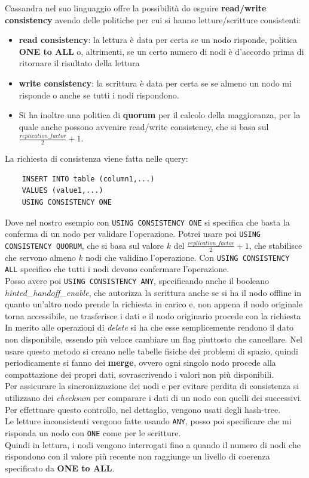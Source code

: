 Cassandra nel suo linguaggio offre la possibilità do esguire \textbf{read/write consistency} avendo delle politiche per cui si hanno letture/scritture consistenti:
\begin{itemize}
  \item \textbf{read consistency}: la lettura è data per certa se un nodo risponde, politica \textbf{ONE to ALL} o, altrimenti, se un certo numero di nodi è d'accordo prima di ritornare il risultato della lettura
  \item \textbf{write consistency}: la scrittura è data per certa se se almeno un nodo mi risponde o anche se tutti i nodi rispondono. 
  \item Si ha inoltre una politica di \textbf{quorum} per il calcolo della maggioranza, per la quale anche possono avvenire read/write consistency, che si basa sul \textbf{$\frac{replication \_ factor}{2} + 1$}.
\end{itemize}
La richiesta di consistenza viene fatta nelle query: 
\begin{lstlisting}
    INSERT INTO table (column1,...) 
    VALUES (value1,...) 
    USING CONSISTENCY ONE
\end{lstlisting} 
Dove nel nostro esempio con \texttt{USING CONSISTENCY ONE} si specifica che basta la conferma di un nodo per validare l'operazione. Potrei usare poi \texttt{USING CONSISTENCY QUORUM}, che si basa sul valore $k$ del \textit{$\frac{replication \_ factor}{2} + 1$}, che stabilisce che servono almeno $k$ nodi che validino l'operazione. Con \texttt{USING CONSISTENCY ALL} specifico che tutti i nodi devono confermare l'operazione.\\

Posso avere poi \texttt{USING CONSISTENCY ANY}, specificando anche il booleano \textit{hinted\_handoff\_enable}, che autorizza la scrittura anche se si ha il nodo offline in quanto un'altro nodo prende la richiesta in carico e, non appena il nodo originale torna accessibile, ne trasferisce i dati e il nodo originario procede con la richiesta\\

In merito alle operazioni di \textit{delete} si ha che esse semplicemente rendono il dato non disponibile, essendo più veloce cambiare un flag piuttosto che cancellare. Nel usare questo metodo si creano nelle tabelle fisiche dei problemi di spazio, quindi periodicamente si fanno dei \textbf{merge}, ovvero ogni singolo nodo procede alla compattazione dei propri dati, sovrascrivendo i valori non più disponibili.\\

Per assicurare la sincronizzazione dei nodi e per evitare perdita di consistenza si utilizzano dei \textit{checksum} per comparare i dati di un nodo con quelli dei successivi. Per effettuare questo controllo, nel dettaglio, vengono usati degli hash-tree.\\

Le letture inconsistenti vengono fatte usando \texttt{ANY}, posso poi specificare che mi risponda un nodo con \texttt{ONE} come per le scritture.\\ 
Quindi in lettura, i nodi vengono interrogati fino a quando il numero di nodi che rispondono con il valore più recente non raggiunge un livello di coerenza specificato da \textbf{ONE to ALL}.